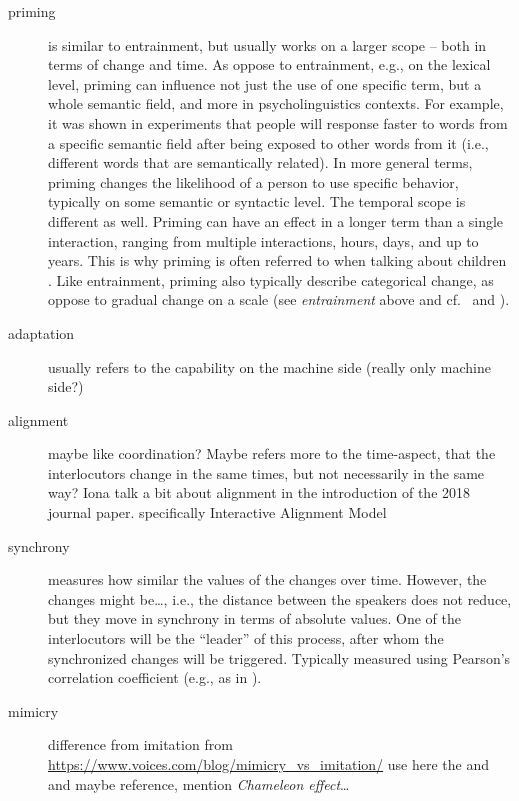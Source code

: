 \begin{description}
	\item[priming] is similar to entrainment, but usually works on a larger scope -- both in terms of change and time.
	As oppose to entrainment, e.g., on the lexical level, priming can influence not just the use of one specific term, but a whole semantic field, and more in psycholinguistics contexts.
	For example, it was shown in experiments \cite[e.g.,][]{Meyer1971facilitation, Schvaneveldt1973retrieval} that people will response faster to words from a specific semantic field after being exposed to other words from it (i.e., different words that are semantically related).
	In more general terms, priming changes the likelihood of a person to use specific behavior, typically on some semantic or syntactic level.
	The temporal scope is different as well.
	Priming can have an effect in a longer term than a single interaction, ranging from multiple interactions, hours, days, and up to years.
	This is why priming is often referred to when talking about children \cite[see e.g.\ ][]{Huttenlocher2004syntactic, Wansink2012would}.
	Like entrainment, priming also typically describe categorical change, as oppose to gradual change on a scale (see \textit{entrainment} above and cf.\ \citet{Reitter2006computational} and \citet{Pace2013concept}).
	
	\item[adaptation] usually refers to the capability on the machine side (really only machine side?)
	
	\item[alignment] maybe like coordination? Maybe refers more to the time-aspect, that the interlocutors change in the same times, but not necessarily in the same way? Iona talk a bit about alignment in the introduction of the 2018 journal paper. specifically Interactive Alignment Model \citep{Pickering2004behavioral}
	
	\item[synchrony] measures how similar the values of the changes over time.
	However, the changes might be\ldots, i.e., the distance between the speakers does not reduce, but they move in synchrony in terms of absolute values.
	One of the interlocutors will be the ``leader'' of this process, after whom the synchronized changes will be triggered.
	Typically measured using Pearson's correlation coefficient (e.g., as in \citet{Edlund2009pause, Xia2014prosodic}).
	
	\item[mimicry] difference from imitation from \url{https://www.voices.com/blog/mimicry_vs_imitation/} use here the \citet{Chartrand1999chameleon} and \citet{Gueguen2009mimicry} and maybe \citet{Parrill2006seeing} reference, mention \textit{Chameleon effect}\ldots
	

\end{description}
